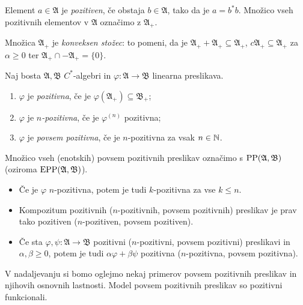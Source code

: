 \begin{definicija}
    Element $a \in \mathfrak{A}$ je \emph{pozitiven}, če obstaja $b \in \mathfrak{A}$, tako da je $a = b^* b$.
    Množico vseh pozitivnih elementov v $\mathfrak{A}$ označimo z $\mathfrak{A}_+$.
\end{definicija}

\begin{opomba}
    Množica $\mathfrak{A}_+$ je \emph{konveksen stožec}: to pomeni, da je $\mathfrak{A}_+ + \mathfrak{A}_+ \subseteq \mathfrak{A}_+$,
    $c \mathfrak{A}_+ \subseteq \mathfrak{A}_+$ za $\alpha \geq 0$ ter $\mathfrak{A}_+ \cap - \mathfrak{A}_+ = \{0\}$.
\end{opomba}

\begin{definicija}
    Naj bosta $\mathfrak{A} , \mathfrak{B}$ $C^*$-algebri in $\varphi: \mathfrak{A} \to \mathfrak{B}$ linearna preslikava.
    \begin{enumerate}
        \item $\varphi$ je \emph{pozitivna}, če je $\varphi(\mathfrak{A}_+) \subseteq \mathfrak{B}_+$;
        \item $\varphi$ je \emph{$n$-pozitivna}, če je $\varphi^{(n)}$ pozitivna;
        \item $\varphi$ je \emph{povsem pozitivna}, če je $n$-pozitivna za vsak $n \in \mathbb N$.
    \end{enumerate}
    Množico vseh (enotskih) povsem pozitivnih preslikav označimo s $\operatorname{PP} (\mathfrak{A}, \mathfrak{B})$ (oziroma $\operatorname{EPP} (\mathfrak{A} , \mathfrak{B})$).
\end{definicija}

\begin{opomba}
    \begin{itemize}
        \item Če je $\varphi$ $n$-pozitivna, potem je tudi $k$-pozitivna za vse $k \leq n$.
        \item Kompozitum pozitivnih ($n$-pozitivnih, povsem pozitivnih) preslikav je prav tako pozitiven ($n$-pozitiven, povsem pozitiven).
        \item Če sta $\varphi, \psi: \mathfrak{A} \to \mathfrak{B}$ pozitivni ($n$-pozitivni, povsem pozitivni) preslikavi in $\alpha, \beta \geq 0$,
        potem je tudi $\alpha \varphi + \beta \psi$ pozitivna ($n$-pozitivna, povsem pozitivna).
    \end{itemize}
\end{opomba}

V nadaljevanju si bomo oglejmo nekaj primerov povsem pozitivnih preslikav
in njihovih osnovnih lastnosti. Model povsem pozitivnih preslikav so pozitivni funkcionali. 

